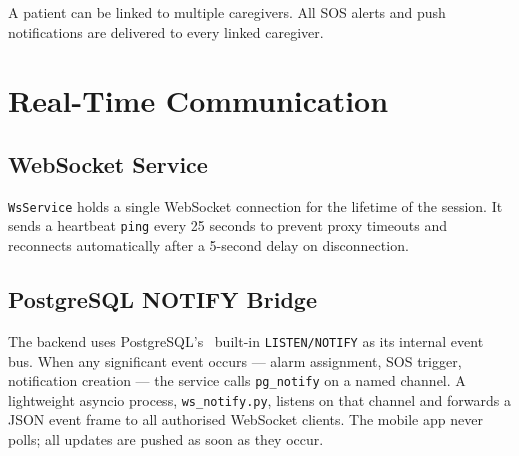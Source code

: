 \documentclass[12pt,a4paper]{report}
\begin{document}
A patient can be linked to multiple caregivers. All SOS alerts and push notifications are delivered to every linked caregiver.

\newpage
\section{Real-Time Communication}

\subsection{WebSocket Service}

\texttt{WsService} holds a single WebSocket connection for the lifetime of the session. It sends a heartbeat \texttt{ping} every 25 seconds to prevent proxy timeouts and reconnects automatically after a 5-second delay on disconnection.

\subsection{PostgreSQL NOTIFY Bridge}

The backend uses PostgreSQL's~\cite{postgresql} built-in \texttt{LISTEN/NOTIFY} as its internal event bus. When any significant event occurs — alarm assignment, SOS trigger, notification creation — the service calls \texttt{pg\_notify} on a named channel. A lightweight asyncio process, \texttt{ws\_notify.py}, listens on that channel and forwards a JSON event frame to all authorised WebSocket clients. The mobile app never polls; all updates are pushed as soon as they occur.
\end{document}
